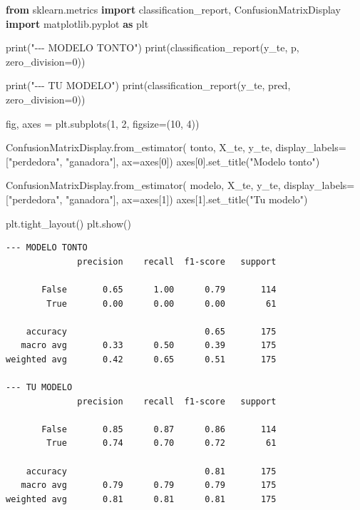 \documentclass[
]{article}
\newenvironment{Shaded}{}{}
\newcommand{\BuiltInTok}[1]{\textcolor[rgb]{0.00,0.50,0.00}{#1}}
\newcommand{\DecValTok}[1]{\textcolor[rgb]{0.25,0.63,0.44}{#1}}
\newcommand{\ImportTok}[1]{\textcolor[rgb]{0.00,0.50,0.00}{\textbf{#1}}}
\newcommand{\NormalTok}[1]{#1}
\newcommand{\OperatorTok}[1]{\textcolor[rgb]{0.40,0.40,0.40}{#1}}
\newcommand{\StringTok}[1]{\textcolor[rgb]{0.25,0.44,0.63}{#1}}
\begin{document}
\protect{}\label{d79996df}
\begin{Shaded}
\begin{Highlighting}[]
\ImportTok{from}\NormalTok{ sklearn.metrics }\ImportTok{import}\NormalTok{ classification\_report, ConfusionMatrixDisplay}
\ImportTok{import}\NormalTok{ matplotlib.pyplot }\ImportTok{as}\NormalTok{ plt}

\BuiltInTok{print}\NormalTok{(}\StringTok{"{-}{-}{-} MODELO TONTO"}\NormalTok{)}
\BuiltInTok{print}\NormalTok{(classification\_report(y\_te, p, zero\_division}\OperatorTok{=}\DecValTok{0}\NormalTok{))}

\BuiltInTok{print}\NormalTok{(}\StringTok{"{-}{-}{-} TU MODELO"}\NormalTok{)}
\BuiltInTok{print}\NormalTok{(classification\_report(y\_te, pred, zero\_division}\OperatorTok{=}\DecValTok{0}\NormalTok{))}

\NormalTok{fig, axes }\OperatorTok{=}\NormalTok{ plt.subplots(}\DecValTok{1}\NormalTok{, }\DecValTok{2}\NormalTok{, figsize}\OperatorTok{=}\NormalTok{(}\DecValTok{10}\NormalTok{, }\DecValTok{4}\NormalTok{))}

\NormalTok{ConfusionMatrixDisplay.from\_estimator(}
\NormalTok{    tonto, X\_te, y\_te, display\_labels}\OperatorTok{=}\NormalTok{[}\StringTok{"perdedora"}\NormalTok{, }\StringTok{"ganadora"}\NormalTok{], ax}\OperatorTok{=}\NormalTok{axes[}\DecValTok{0}\NormalTok{])}
\NormalTok{axes[}\DecValTok{0}\NormalTok{].set\_title(}\StringTok{"Modelo tonto"}\NormalTok{)}

\NormalTok{ConfusionMatrixDisplay.from\_estimator(}
\NormalTok{    modelo, X\_te, y\_te, display\_labels}\OperatorTok{=}\NormalTok{[}\StringTok{"perdedora"}\NormalTok{, }\StringTok{"ganadora"}\NormalTok{], ax}\OperatorTok{=}\NormalTok{axes[}\DecValTok{1}\NormalTok{])}
\NormalTok{axes[}\DecValTok{1}\NormalTok{].set\_title(}\StringTok{"Tu modelo"}\NormalTok{)}

\NormalTok{plt.tight\_layout()}
\NormalTok{plt.show()}
\end{Highlighting}
\end{Shaded}

\begin{verbatim}
--- MODELO TONTO
              precision    recall  f1-score   support

       False       0.65      1.00      0.79       114
        True       0.00      0.00      0.00        61

    accuracy                           0.65       175
   macro avg       0.33      0.50      0.39       175
weighted avg       0.42      0.65      0.51       175

--- TU MODELO
              precision    recall  f1-score   support

       False       0.85      0.87      0.86       114
        True       0.74      0.70      0.72        61

    accuracy                           0.81       175
   macro avg       0.79      0.79      0.79       175
weighted avg       0.81      0.81      0.81       175

\end{verbatim}
\end{document}
